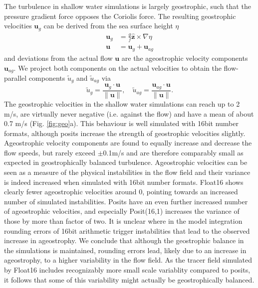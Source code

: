 \documentclass[draft]{agujournal2019}
\begin{document}
The turbulence in shallow water simulations is largely geostrophic, such that the pressure gradient force opposes the Coriolis force. The resulting geostrophic velocities $\mathbf{u}_g$ can be derived from the sea surface height $\eta$
\begin{subequations}
\begin{align}
\mathbf{u}_g &= \frac{g}{f}\hat{\mathbf{z}} \times \nabla \eta \\
\mathbf{u} &= \mathbf{u}_{g} + \mathbf{u}_{ag}
\end{align}
\label{eq:geo}%
\end{subequations}
and deviations from the actual flow $\mathbf{u}$ are the ageostrophic velocity components $\mathbf{u}_{ag}$. We project both components on the actual velocities to obtain the flow-parallel components $\tilde{u}_{g}$ and $\tilde{u}_{ag}$ via
\begin{equation}
\tilde{u}_g = \frac{\mathbf{u}_g \cdot \mathbf{u}}{\| \mathbf{u} \|}, \quad \tilde{u}_{ag} = \frac{\mathbf{u}_{ag} \cdot \mathbf{u}}{\| \mathbf{u} \|}.
\label{eq:parallel}%
\end{equation}
The geostrophic velocities in the shallow water simulations can reach up to 2 m/s, are virtually never negative (i.e. against the flow) and have a mean of about 0.7 m/s (Fig. \ref{fig:geo}a). This behaviour is well simulated with 16bit number formats, although posits increase the strength of geostrophic velocities slightly. Ageostrophic velocity components are found to equally increase and decrease the flow speeds, but rarely exceed $\pm$0.1m/s and are therefore comparably small as expected in geostrophically balanced turbulence. Ageostrophic velocities can be seen as a measure of the physical instabilities in the flow field and their variance is indeed increased when simulated with 16bit number formats. Float16 shows clearly fewer ageostrophic velocities around 0, pointing towards an increased number of simulated instabilities. Posits have an even further increased number of ageostrophic velocities, and especially Posit(16,1) increases the variance of those by more than factor of two. It is unclear where in the model integration rounding errors of 16bit arithmetic trigger instabilities that lead to the observed increase in ageostrophy. We conclude that although the geostrophic balance in the simulations is maintained, rounding errors lead, likely due to an increase in ageostrophy, to a higher variability in the flow field. As the tracer field simulated by Float16 includes recognizably more small scale variablity compared to posits, it follows that some of this variability might actually be geostrophically balanced. 
\end{document}
